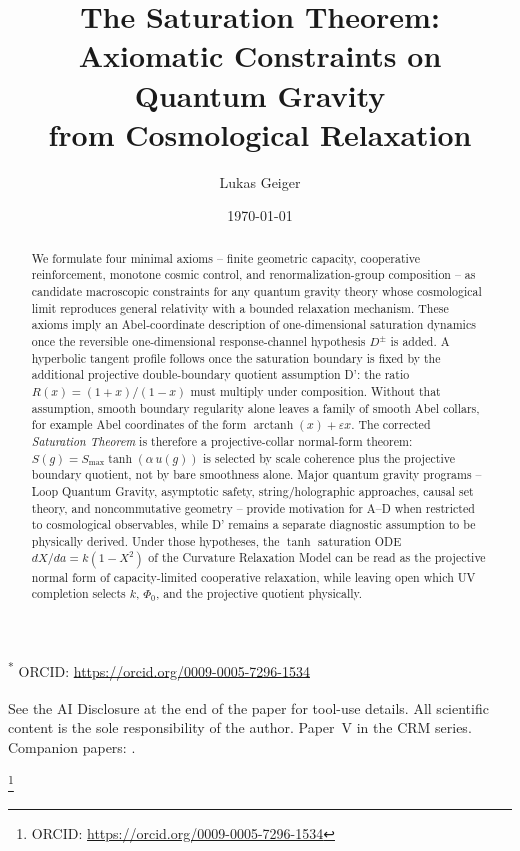 \documentclass[aps,prd,twocolumn,superscriptaddress,nofootinbib]{revtex4-2}
\begin{document}
\vfill
{\small
\noindent\textsuperscript{*} ORCID: \url{https://orcid.org/0009-0005-7296-1534}\par
\noindent\textsuperscript{\textdagger} See the AI Disclosure at the end of the paper for tool-use details. All scientific content is the sole responsibility of the author. Paper~V in the CRM series. Companion papers: \cite{Geiger2026,Geiger2026b,Geiger2026c,Geiger2026d}.\par
}

\clearpage
\twocolumngrid
{}

\iffalse


\title{The Saturation Theorem: Axiomatic Constraints on Quantum Gravity\texorpdfstring{\\}{ }from Cosmological Relaxation}

\author{Lukas Geiger}
\thanks{ORCID: \url{https://orcid.org/0009-0005-7296-1534}}

\date{\today}

\begin{abstract}
We formulate four minimal axioms -- finite geometric capacity, cooperative reinforcement, monotone cosmic control, and renormalization-group composition -- as candidate macroscopic constraints for any quantum gravity theory whose cosmological limit reproduces general relativity with a bounded relaxation mechanism. These axioms imply an Abel-coordinate description of one-dimensional saturation dynamics once the reversible one-dimensional response-channel hypothesis $D^\pm$ is added. A hyperbolic tangent profile follows once the saturation boundary is fixed by the additional projective double-boundary quotient assumption D': the ratio $R(x)=(1+x)/(1-x)$ must multiply under composition. Without that assumption, smooth boundary regularity alone leaves a family of smooth Abel collars, for example Abel coordinates of the form $\operatorname{arctanh}(x)+\varepsilon x$. The corrected \textit{Saturation Theorem} is therefore a projective-collar normal-form theorem: $S(g)=S_{\max}\tanh(\alpha\,u(g))$ is selected by scale coherence plus the projective boundary quotient, not by bare smoothness alone. Major quantum gravity programs -- Loop Quantum Gravity, asymptotic safety, string/holographic approaches, causal set theory, and noncommutative geometry -- provide motivation for A--D when restricted to cosmological observables, while D' remains a separate diagnostic assumption to be physically derived. Under those hypotheses, the $\tanh$ saturation ODE $dX/da = k(1-X^2)$ of the Curvature Relaxation Model can be read as the projective normal form of capacity-limited cooperative relaxation, while leaving open which UV completion selects $k$, $\Phi_0$, and the projective quotient physically.
\end{abstract}
\end{document}
